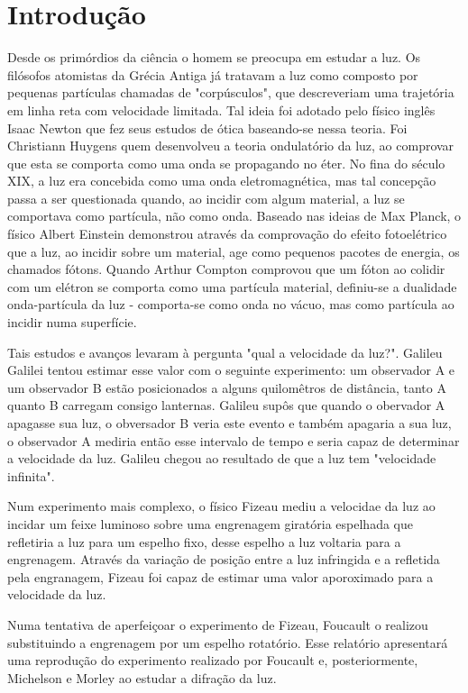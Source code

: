 \section{Introdução}
Desde os primórdios da ciência o homem se preocupa em estudar a luz. Os
filósofos atomistas da Grécia Antiga já tratavam a luz como composto
por pequenas partículas chamadas de "corpúsculos", que descreveriam
uma trajetória em linha reta com velocidade limitada. Tal ideia foi
adotado pelo físico inglês Isaac Newton que fez seus estudos de ótica
baseando-se nessa teoria. Foi Christiann Huygens quem desenvolveu a
teoria ondulatório da luz, ao comprovar que esta se comporta como uma
onda se propagando no éter. No fina do século XIX, a luz era concebida
como uma onda eletromagnética, mas tal concepção passa a ser
questionada quando, ao incidir com algum material, a luz se comportava
como partícula, não como onda. Baseado nas ideias de Max Planck, o
físico Albert Einstein demonstrou através da comprovação do efeito
fotoelétrico que a luz, ao incidir sobre um material, age como
pequenos pacotes de energia, os chamados fótons. Quando Arthur Compton
comprovou que um fóton ao colidir com um elétron se comporta como
uma partícula material, definiu-se a dualidade onda-partícula da luz -
comporta-se como onda no vácuo, mas como partícula ao incidir numa
superfície.

Tais estudos e avanços levaram à pergunta "qual a velocidade da luz?".
Galileu Galilei tentou estimar esse valor com o seguinte experimento:
um observador A e um observador B estão posicionados a alguns
quilomêtros de distância, tanto A quanto B carregam consigo lanternas.
Galileu supôs que quando o obervador A apagasse sua luz, o obversador
B veria este evento e também apagaria a sua luz, o observador A
mediria então esse intervalo de tempo e seria capaz de determinar a
velocidade da luz. Galileu chegou ao resultado de que a luz tem
"velocidade infinita".

Num experimento mais complexo, o físico Fizeau mediu a velocidae da
luz ao incidar um feixe luminoso sobre uma engrenagem giratória
espelhada que refletiria a luz para um espelho fixo, desse espelho a
luz voltaria para a engrenagem. Através da variação de posição entre a
luz infringida e a refletida pela engranagem, Fizeau foi capaz de
estimar uma valor aporoximado para a velocidade da luz.

Numa tentativa de aperfeiçoar o experimento de Fizeau, Foucault o
realizou substituindo a engrenagem por um espelho rotatório. Esse
relatório apresentará uma reprodução do experimento realizado por
Foucault e, posteriormente, Michelson e Morley ao estudar a difração
da luz.
